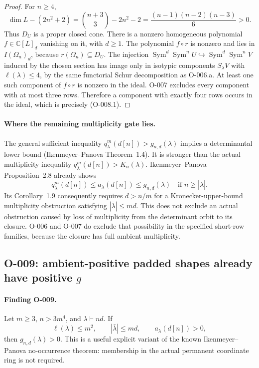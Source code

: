 \begin{proof}
For $n\geq4$,
\[
 \dim L-(2n^2+2)
 =\binom{n+3}{3}-2n^2-2
 =\frac{(n-1)(n-2)(n-3)}6>0.
\]
Thus $D_U$ is a proper closed cone. There is a nonzero homogeneous
polynomial $f\in\mathbb C[L]_d$ vanishing on it, with $d\geq1$.
The polynomial $f\circ r$ is nonzero and lies in $I(\Omega_n)_d$,
because $r(\Omega_n)\subseteq D_U$.
The injection
$\operatorname{Sym}^d\operatorname{Sym}^n U\hookrightarrow
\operatorname{Sym}^d\operatorname{Sym}^n V$ induced by the chosen
section has image only in isotypic components $S_\lambda V$ with
$\ell(\lambda)\leq4$, by the same functorial Schur decomposition as
O-006.a. At least one such component of $f\circ r$ is nonzero in the
ideal. O-007 excludes every component with at most three rows.
Therefore a component with exactly four rows occurs in the ideal,
which is precisely (O-008.1).
\end{proof}

\paragraph{Where the remaining multiplicity gate lies.}
The general sufficient inequality
$q^m_\lambda(d[n])>g_{n,d}(\lambda)$ implies a determinantal lower
bound (Ikenmeyer--Panova Theorem~1.4). It is stronger than the actual
multiplicity inequality $q^m_\lambda(d[n])>K_n(\lambda)$.
Ikenmeyer--Panova Proposition~2.8 already shows
\[
       q^m_\lambda(d[n])\leq a_\lambda(d[n])\leq g_{n,d}(\lambda)
                 \quad\text{if }n\geq|\bar\lambda|.
\]
Its Corollary~1.9 consequently requires $d>n/m$ for a
Kronecker-upper-bound multiplicity obstruction satisfying
$|\bar\lambda|\leq md$. This does not exclude an actual obstruction
caused by loss of multiplicity from the determinant orbit to its
closure. O-006 and O-007 do exclude that possibility in the specified
short-row families, because the closure has full ambient multiplicity.

\subsection{O-009: ambient-positive padded shapes already have positive $g$}

\paragraph{Finding O-009.}
Let $m\geq3$, $n>3m^4$, and $\lambda\vdash nd$. If
\[
 \ell(\lambda)\leq m^2,\qquad |\bar\lambda|\leq md,
                     \qquad a_\lambda(d[n])>0,
\]
then $g_{n,d}(\lambda)>0$.
This is a useful explicit variant of the known Ikenmeyer--Panova
no-occurrence theorem: membership in the actual permanent coordinate
ring is not required.

